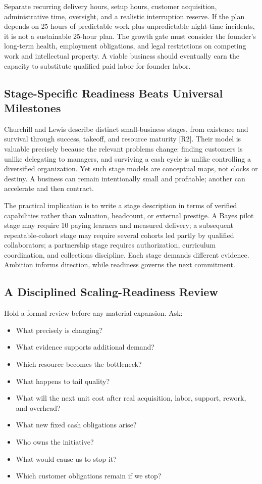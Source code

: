 Separate recurring delivery hours, setup hours, customer acquisition, administrative time, oversight, and a realistic interruption reserve. If the plan depends on 25 hours of predictable work plus unpredictable night-time incidents, it is not a sustainable 25-hour plan. The growth gate must consider the founder's long-term health, employment obligations, and legal restrictions on competing work and intellectual property. A viable business should eventually earn the capacity to substitute qualified paid labor for founder labor.

\subsection{Stage-Specific Readiness Beats Universal Milestones}
\label{sec:stage_specific_readiness}

Churchill and Lewis describe distinct small-business stages, from existence and survival through success, takeoff, and resource maturity [R2]. Their model is valuable precisely because the relevant problems change: finding customers is unlike delegating to managers, and surviving a cash cycle is unlike controlling a diversified organization. Yet such stage models are conceptual maps, not clocks or destiny. A business can remain intentionally small and profitable; another can accelerate and then contract.

The practical implication is to write a stage description in terms of verified capabilities rather than valuation, headcount, or external prestige. A Bayes pilot stage may require 10 paying learners and measured delivery; a subsequent repeatable-cohort stage may require several cohorts led partly by qualified collaborators; a partnership stage requires authorization, curriculum coordination, and collections discipline. Each stage demands different evidence. Ambition informs direction, while readiness governs the next commitment.

\subsection{A Disciplined Scaling-Readiness Review}
\label{sec:disciplined_scaling_readiness_review}

Hold a formal review before any material expansion. Ask:
\begin{itemize}
    \item What precisely is changing?
    \item What evidence supports additional demand?
    \item Which resource becomes the bottleneck?
    \item What happens to tail quality?
    \item What will the next unit cost after real acquisition, labor, support, rework, and overhead?
    \item What new fixed cash obligations arise?
    \item Who owns the initiative?
    \item What would cause us to stop it?
    \item Which customer obligations remain if we stop?
\end{itemize}


